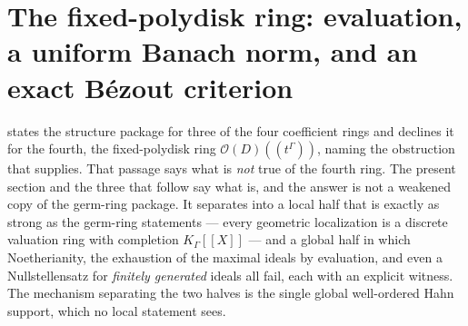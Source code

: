 \documentclass[11pt,letterpaper]{article}
\theoremstyle{definition}
\theoremstyle{remark}
\newcommand{\OO}{\mathcal O}
\numberwithin{equation}{section}
\begin{document}
\section{The fixed-polydisk ring: evaluation, a uniform Banach norm, and an
exact B\'ezout criterion}\label{analytic:sec:fixed-polydisk}

 states the structure package for three of
the four coefficient rings and declines it for the fourth, the
fixed-polydisk ring $\OO(D)((t^\Gamma))$, naming the obstruction that
\cite{FiniteDeformations} supplies. That passage says what is \emph{not}
true of the fourth ring. The present section and the three that follow say
what is, and the answer is not a weakened copy of the germ-ring package. It
separates into a local half that is exactly as strong as the germ-ring
statements --- every geometric localization is a discrete valuation ring
with completion $K_\Gamma[[X]]$ --- and a global half in which
Noetherianity, the exhaustion of the maximal ideals by evaluation, and even
a Nullstellensatz for \emph{finitely generated} ideals all fail, each with
an explicit witness. The mechanism separating the two halves is the single
global well-ordered Hahn support, which no local statement sees.
\end{document}
